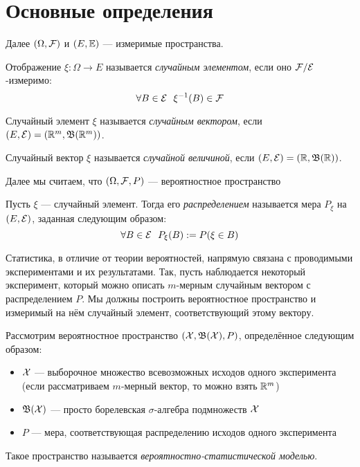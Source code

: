 \section{Основные определения}

\begin{note}
	Далее $(\Omega, \mathcal{F})$ и $(E, \mathbb{E})$ --- измеримые пространства.
\end{note}

\begin{definition}
	Отображение $\xi \colon \Omega \to E$ называется \textit{случайным элементом}, если оно $\mathcal{F}/\mathcal{E}$-измеримо:
	\[
		\forall B \in \mathcal{E}\ \ \xi^{-1}(B) \in \mathcal{F}
	\]
\end{definition}

\begin{definition}
	Случайный элемент $\xi$ называется \textit{случайным вектором}, если $(E, \mathcal{E}) = (\mathbb{R}^m, \mathfrak{B}(\mathbb{R}^m))$.
\end{definition}

\begin{definition}
	Случайный вектор $\xi$ называется \textit{случайной величиной}, если $(E, \mathcal{E}) = (\mathbb{R}, \mathfrak{B}(\mathbb{R}))$.
\end{definition}

\begin{note}
	Далее мы считаем, что $(\Omega, \mathcal{F}, P)$ --- вероятностное пространство
\end{note}

\begin{definition}
	Пусть $\xi$ --- случайный элемент. Тогда его \textit{распределением} называется мера $P_\xi$ на $(E, \mathcal{E})$, заданная следующим образом:
	\[
		\forall B \in \mathcal{E}\ \ P_\xi(B) := P(\xi \in B)
	\]
\end{definition}

\begin{note}
	Статистика, в отличие от теории вероятностей, напрямую связана с проводимыми экспериментами и их результатами. Так, пусть наблюдается некоторый эксперимент, который можно описать $m$-мерным случайным вектором с распределением $P$. Мы должны построить вероятностное пространство и измеримый на нём случайный элемент, соответствующий этому вектору. 
\end{note}

\begin{definition}
	Рассмотрим вероятностное пространство $(\mathcal{X}, \mathfrak{B}(\mathcal{X}), P)$, определённое следующим образом:
	\begin{itemize}
		\item $\mathcal{X}$ --- выборочное множество всевозможных исходов одного эксперимента (если рассматриваем $m$-мерный вектор, то можно взять $\mathbb{R}^m$)
		
		\item $\mathfrak{B}(\mathcal{X})$ --- просто борелевская $\sigma$-алгебра подмножеств $\mathcal{X}$
		
		\item $P$ --- мера, соответствующая распределению исходов одного эксперимента
	\end{itemize}
	Такое пространство называется \textit{вероятностно-статистической моделью}.
\end{definition}

